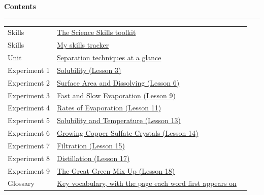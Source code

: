 \clearpage
{\headingfont\bfseries\LARGE Contents}\par\vspace{1mm}\noindent\rule{\linewidth}{0.6pt}\par\vspace{2mm}
\begin{ctab}
\renewcommand{\arraystretch}{1.5}
\begin{tabular}{|L{2.8cm}|L{10.2cm}|C{1.6cm}|}
  \hline{} &  &  \\ \hline
  Skills & \hyperlink{toolkit}{The Science Skills toolkit} & \hyperlink{toolkit}{\pageref{sec:toolkit}} \\ \hline
  Skills & \hyperlink{tracker}{My skills tracker} & \hyperlink{tracker}{\pageref{sec:tracker}} \\ \hline
  Unit & \hyperlink{glance}{Separation techniques at a glance} & \hyperlink{glance}{\pageref{sec:glance}} \\ \hline
  Experiment 1 & \hyperlink{exp.1}{Solubility (Lesson 3)} & \hyperlink{exp.1}{\pageref{sec:1}} \\ \hline
  Experiment 2 & \hyperlink{exp.2}{Surface Area and Dissolving (Lesson 6)} & \hyperlink{exp.2}{\pageref{sec:2}} \\ \hline
  Experiment 3 & \hyperlink{exp.3}{Fast and Slow Evaporation (Lesson 9)} & \hyperlink{exp.3}{\pageref{sec:3}} \\ \hline
  Experiment 4 & \hyperlink{exp.4}{Rates of Evaporation (Lesson 11)} & \hyperlink{exp.4}{\pageref{sec:4}} \\ \hline
  Experiment 5 & \hyperlink{exp.5}{Solubility and Temperature (Lesson 13)} & \hyperlink{exp.5}{\pageref{sec:5}} \\ \hline
  Experiment 6 & \hyperlink{exp.6}{Growing Copper Sulfate Crystals (Lesson 14)} & \hyperlink{exp.6}{\pageref{sec:6}} \\ \hline
  Experiment 7 & \hyperlink{exp.7}{Filtration (Lesson 15)} & \hyperlink{exp.7}{\pageref{sec:7}} \\ \hline
  Experiment 8 & \hyperlink{exp.8}{Distillation (Lesson 17)} & \hyperlink{exp.8}{\pageref{sec:8}} \\ \hline
  Experiment 9 & \hyperlink{exp.9}{The Great Green Mix Up (Lesson 18)} & \hyperlink{exp.9}{\pageref{sec:9}} \\ \hline
  Glossary & \hyperlink{glossary}{Key vocabulary, with the page each word first appears on} & \hyperlink{glossary}{\pageref{sec:glossary}} \\ \hline
\end{tabular}
\end{ctab}

